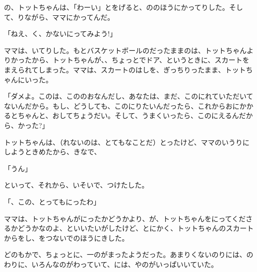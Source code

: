 の、トットちゃんは、「わーい」とをげると、ののほうにかってりした。そして、りながら、ママにかってんだ。

「ねえ、く、かないにってみよう!」

ママは、いてりした。もとバスケットボールのだったままのは、トットちゃんよりかったから、トットちゃんが、、ちょっとでドア、というときに、スカートをまえられてしまった。ママは、スカートのはしを、ぎっちりったまま、トットちゃんにいった。

「ダメよ。このは、こののおなんだし、あなたは、まだ、このにれていただいてないんだから。もし、どうしても、このにりたいんだったら、これからおにかかるとちゃんと、おしてちょうだい。そして、うまくいったら、このにえるんだから、かった?」

トットちゃんは、（れないのは、とてもなことだ）とったけど、ママのいうりにしようときめたから、きなで、

「うん」

といって、それから、いそいで、つけたした。

「、この、とってもにったわ」

ママは、トットちゃんがにったかどうかより、が、トットちゃんをにってくださるかどうかなのよ、といいたいがしたけど、とにかく、トットちゃんのスカートからをし、をつないでのほうにきした。

どのもかで、ちょっとに、一のがまったようだった。あまりくないのりには、のわりに、いろんなのがわっていて、には、やのがいっぱいいていた。

